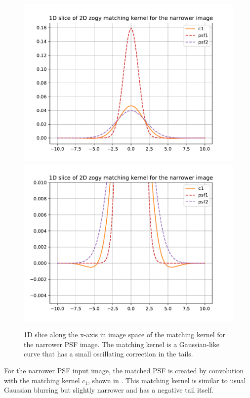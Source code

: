 \begin{figure}
\begin{center}
\includegraphics[width=4.5in]{fig/zogy_theo_Gaussians_img_c1.pdf}
\includegraphics[width=4.5in]{fig/zogy_theo_Gaussians_img_c1_tails.pdf}
\end{center}
\caption{\label{fig:theo_Gaussians_img_c1}1D slice along the x-axis in image
  space of the matching kernel for the narrower PSF image. The matching
  kernel is a Gaussian-like curve that has a small oscillating correction in
  the tails.}
\end{figure}
%
\par For the narrower PSF input image, the matched PSF is created by
convolution with the matching kernel \(c_1\), shown in
. This matching kernel is similar to usual
Gaussian blurring but slightly narrower and has a negative tail itself.
%
